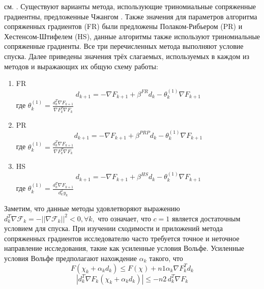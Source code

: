 см. \cite{art8,art9,art10,art11,art12,art13,art14,art15}. Существуют варианты
метода, использующие триномиальные сопряженные градиентны, предложенные Чжангом
\cite{art16}. Также значения для параметров алгоритма сопряженных градиентов
(FR) были предложены Полаком-Рибьером (PR) и Хестенсом-Штифелем (HS), данные
алгоритмы также используют триномиальные сопряженные градиенты. Все три
перечисленных метода выполняют условие спуска. Далее приведены значения трёх
слагаемых, используемых в каждом из методов и выражающих их общую схему работы:

\begin{enumerate}
    \item FR
    \begin{equation*}
        d_{k+1}=-\nabla F_{k+1}+\beta^{F R}d_{k}-\theta_{k}^{(1)}\nabla F_{k+1}
    \end{equation*}
    где $ \theta_{k}^{(1)}=\frac{d_{k}^{T}\nabla F_{k+1}}{\nabla F_{k}^{T}\nabla F_{k}} $
    \item PR
    \begin{equation*}
        d_{k+1}=-\nabla F_{k+1}+\beta^{P R P}d_{k}-\theta_{k}^{(1)}\nabla F_{k+1}
    \end{equation*}
    где $\theta_{k}^{(1)}=\frac{d_{k}^{T}\nabla F_{k+1}}{\nabla F_{k}^{T}\nabla F_{k}}$
    \item HS
    \begin{equation*}
        d_{k+1}=-\nabla F_{k+1}+\beta^{H S}d_{k}-\theta_{k}^{(1)}\nabla F_{k+1}
    \end{equation*}
    где $ \theta_{k}^{(1)}=\frac{d_{k}^{T}\nabla F_{k+1}}{d_{k}^{T}y_{k}} $
\end{enumerate}

Заметим, что данные методы удовлетворяют выражению $d_{k}^{T}\mathcal{\nabla
F}_{k}=-||\mathcal{\nabla F}_{k}||^{2}<0,\forall k,$ что означает, что $c = 1$
является достаточным условием для спуска. При изучении сходимости и приложений
метода сопряженных градиентов исследователю часто требуется точное и неточное
направление исследования, такие как усиленные условия Вольфе. Усиленные условия
Вольфе предполагают нахождение $\alpha_{k}$ такого, что
\begin{equation}\label{eqn:eq5}
    F(\chi_{k}+\alpha_{k}d_{k})\leq F(\chi) + n1 \alpha_{k} \nabla F_{k}^{T}d_{k}
\end{equation}
\begin{equation}\label{eqn:eq6}
    |d_{k}^{T}\nabla F_{k}(\chi_{k}+\alpha_{k}d_{k})|\leq-n2\,d_{k}^{T}\nabla F_{k}
\end{equation}

